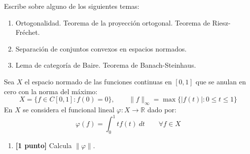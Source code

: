 \documentclass[12pt]{article}
\begin{document}
    \begin{ejercicio}[3 puntos]
        Escribe sobre alguno de los siguientes temas:
        \begin{enumerate}[label=\alph*)]
            \item Ortogonalidad. Teorema de la proyección ortogonal. Teorema de Riesz-Fréchet.
            \item Separación de conjuntos convexos en espacios normados.
            \item Lema de categoría de Baire. Teorema de Banach-Steinhaus.
        \end{enumerate}
    \end{ejercicio}

    \newpage
    \setcounter{ejercicio}{0} %

    \begin{ejercicio}[1.5 puntos]
        Sea $X$ el espacio normado de las funciones continuas en $[0,1]$ que se anulan en cero con la norma del máximo:
        \begin{equation*}
            X = \{f\in C[0,1] : f(0) = 0\}, \qquad \|f\|_\infty = \max\{|f(t)| : 0\leq t \leq 1\}
        \end{equation*}
        En $X$ se considera el funcional lineal $\varphi:X\to \mathbb{R}$ dado por:
        \begin{equation*}
            \varphi(f) = \int_{0}^{1} tf(t)~dt \qquad \forall f\in X
        \end{equation*}
        \begin{enumerate}[label=\alph*)]
            \item \textbf{[1 punto]} Calcula $\|\varphi\|$.
            

\end{enumerate}
\end{ejercicio}
\end{document}
